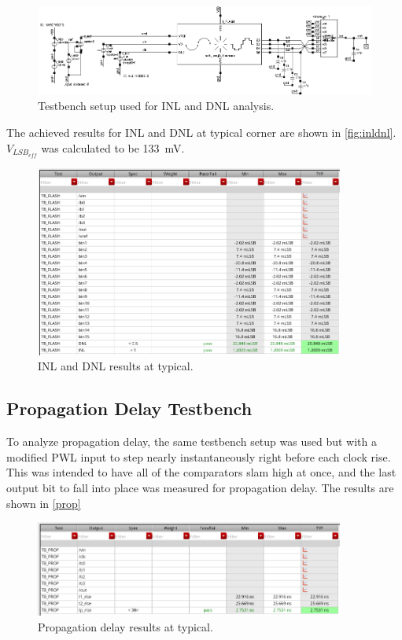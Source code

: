 \documentclass[11pt,letterpaper]{article}
\begin{document}
\begin{figure}[!t]
    \centering
    \includegraphics[width=6in]{flashtb.eps}
    \caption{Testbench setup used for INL and DNL analysis.}
    \label{fig:tb-sch}
\end{figure}

The achieved results for INL and DNL at typical corner are shown in \cref{fig:inldnl}. \(V_{LSB_{eff}}\) was calculated to be \qty{133}{\mV}.

\begin{figure}[htbp!]
    \centering
    \includegraphics[width=4in]{INL_DNL_TYP.png}
    \caption{INL and DNL results at typical.}
    \label{fig:prop-plot}
\end{figure}

\subsection{Propagation Delay Testbench}

To analyze propagation delay, the same testbench setup was used but with a modified PWL input to step nearly instantaneously right before each clock rise. This was intended to have all of the comparators slam high at once, and the last output bit to fall into place was measured for propagation delay. The results are shown in \cref{prop}

\begin{figure}[htbp!]
    \centering
    \includegraphics[width=4in]{TP_TYP.png}
    \caption{Propagation delay results at typical.}
    \label{fig:prop}
\end{figure}
\end{document}
